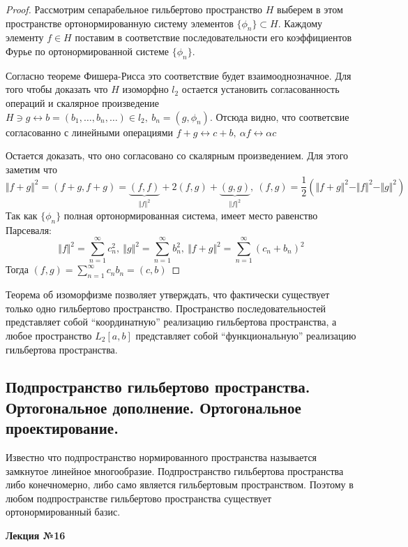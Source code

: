 \documentclass[14pt,a4paper]{extarticle}
\theoremstyle{definition}
\theoremstyle{remark}
\renewcommand{\[}{\begin{dmath*}[compact]}
\renewcommand{\]}{\end{dmath*}}
\newcommand{\sep}{ , \ \allowbreak }
\newcommand\f[2]{\dfrac{#1}{#2}}
\begin{document}
\begin{proof}
  Рассмотрим сепарабельное гильбертово пространство $H$ выберем в этом
  пространстве ортонормированную систему элементов $\{\phi_n\} \subset H$.
  Каждому элементу $f \in H$ поставим в соответствие последовательности его
  коэффициентов Фурье по ортонормированной системе $\{\phi_n\}$.

  Согласно теореме Фишера-Рисса это соответствие будет взаимооднозначное.
  Для того чтобы доказать что $H$ изоморфно $l_2$ остается установить
  согласованность операций и скалярное произведение
  $H \ni g \leftrightarrow b = (b_1, \dots, b_n, \dots) \in l_2 \sep
  b_n= (g,\phi_n)$.
  Отсюда видно, что соответсвие согласованно с линейными операциями
  $f+g \leftrightarrow c+b \sep \alpha f \leftrightarrow \alpha c$

  Остается доказать, что оно согласовано со скалярным произведением.
  Для этого заметим что
  \[\Vert f+g \Vert ^ 2 = (f+g, f+g)
  = \underbrace{(f,f)}_{\Vert f \Vert^2} + 2(f,g)
    + \underbrace{(g,g)}_{\Vert f \Vert^2} \sep (f,g)
  = \f{1}{2}(\Vert f+g \Vert ^2 - \Vert f \Vert^2 - \Vert g \Vert ^2)\]
  Так как $\{\phi_n\}$ полная ортонормированная система, имеет место
  равенство Парсеваля:
  \[\Vert f \Vert^2 = \sum_{n=1}^\infty c_n^2 \sep
  \Vert g \Vert^2 = \sum_{n=1}^\infty b_n^2 \sep
  \Vert f+g \Vert^2 = \sum_{n=1}^\infty(c_n+b_n)^2\]
  Тогда $(f,g) = \sum_{n=1}^\infty c_n b_n = (c,b)$
\end{proof}

Теорема об изоморфизме позволяет утверждать, что фактически существует только
одно гильбертово пространство. Пространство последовательностей представляет
собой ``координатную'' реализацию гильбертова пространства,
а любое пространство $L_2[a,b]$ представляет собой ``функциональную''
реализацию гильбертова пространства.

\subsection{Подпространство гильбертово пространства. Ортогональное дополнение.
Ортогональное проектирование.}

Известно что подпространство нормированного пространства называется
замкнутое линейное многообразие.
Подпространство гильбертова пространства либо конечномерно,
либо само является гильбертовым пространством.
Поэтому в любом подпространстве гильбертово пространства
существует ортонормированный базис.

\textbf{Лекция №16}
\end{document}
